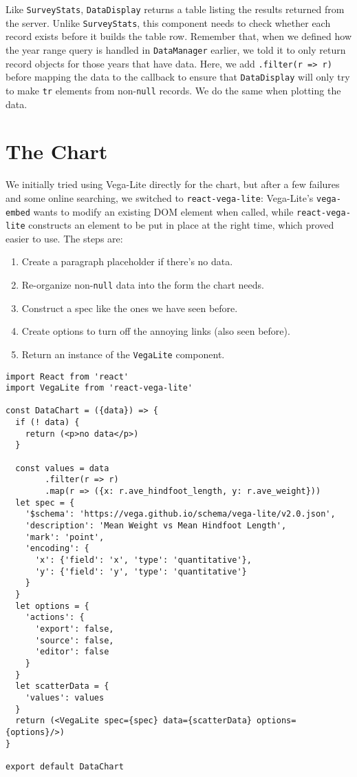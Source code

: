 Like \texttt{SurveyStats}, \texttt{DataDisplay} returns a table listing the results returned from the server.
Unlike \texttt{SurveyStats},
this component needs to check whether each record exists before it builds the table row.
Remember that,
when we defined how the year range query is handled in \texttt{DataManager} earlier,
we told it to only return record objects for those years that have data.
Here, we add \texttt{.filter(r\ =\textgreater{}\ r)} before mapping the data to the callback
to ensure that \texttt{DataDisplay} will only try to make \texttt{tr} elements from non-\texttt{null} records.
We do the same when plotting the data.

\section{The Chart}\label{s:capstone-chart}

We initially tried using Vega-Lite directly for the chart,
but after a few failures and some online searching,
we switched to \texttt{react-vega-lite}:
Vega-Lite's \texttt{vega-embed} wants to modify an existing DOM element when called,
while \texttt{react-vega-lite} constructs an element to be put in place at the right time,
which proved easier to use.
The steps are:

\begin{enumerate}
\item
  Create a paragraph placeholder if there's no data.
\item
  Re-organize non-\texttt{null} data into the form the chart needs.
\item
  Construct a spec like the ones we have seen before.
\item
  Create options to turn off the annoying links (also seen before).
\item
  Return an instance of the \texttt{VegaLite} component.
\end{enumerate}

\begin{verbatim}
import React from 'react'
import VegaLite from 'react-vega-lite'

const DataChart = ({data}) => {
  if (! data) {
    return (<p>no data</p>)
  }

  const values = data
        .filter(r => r)
        .map(r => ({x: r.ave_hindfoot_length, y: r.ave_weight}))
  let spec = {
    '$schema': 'https://vega.github.io/schema/vega-lite/v2.0.json',
    'description': 'Mean Weight vs Mean Hindfoot Length',
    'mark': 'point',
    'encoding': {
      'x': {'field': 'x', 'type': 'quantitative'},
      'y': {'field': 'y', 'type': 'quantitative'}
    }
  }
  let options = {
    'actions': {
      'export': false,
      'source': false,
      'editor': false
    }
  }
  let scatterData = {
    'values': values
  }
  return (<VegaLite spec={spec} data={scatterData} options={options}/>)
}

export default DataChart
\end{verbatim}

